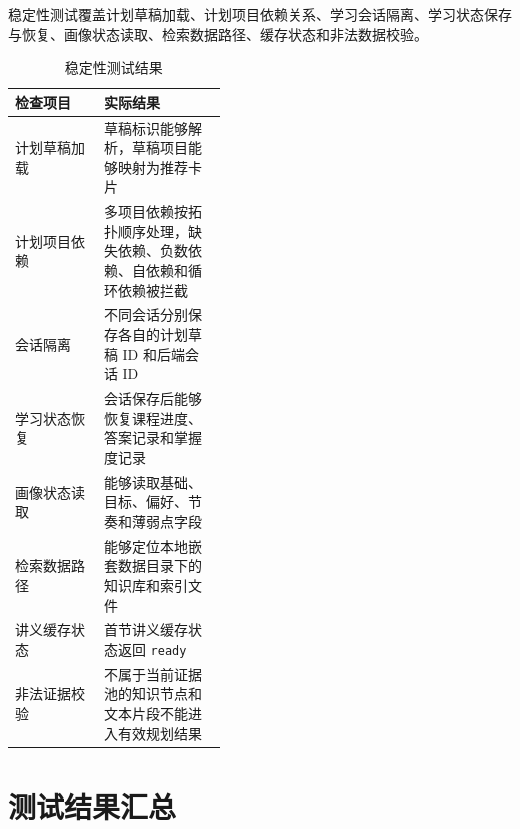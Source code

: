 稳定性测试覆盖计划草稿加载、计划项目依赖关系、学习会话隔离、学习状态保存与恢复、画像状态读取、检索数据路径、缓存状态和非法数据校验。

\begin{table}[H]
  \centering
  \caption{稳定性测试结果}
  \label{tab:stability-test}
  \begin{tabularx}{\linewidth}{p{0.42\linewidth}X}
    \toprule
    检查项目 & 实际结果 \\
    \midrule
    计划草稿加载 & 草稿标识能够解析，草稿项目能够映射为推荐卡片 \\
    计划项目依赖 & 多项目依赖按拓扑顺序处理，缺失依赖、负数依赖、自依赖和循环依赖被拦截 \\
    会话隔离 & 不同会话分别保存各自的计划草稿 ID 和后端会话 ID \\
    学习状态恢复 & 会话保存后能够恢复课程进度、答案记录和掌握度记录 \\
    画像状态读取 & 能够读取基础、目标、偏好、节奏和薄弱点字段 \\
    检索数据路径 & 能够定位本地嵌套数据目录下的知识库和索引文件 \\
    讲义缓存状态 & 首节讲义缓存状态返回 \texttt{ready} \\
    非法证据校验 & 不属于当前证据池的知识节点和文本片段不能进入有效规划结果 \\
    \bottomrule
  \end{tabularx}
\end{table}

\section{测试结果汇总}

